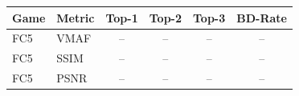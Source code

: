 \begin{tabular}{llcccc}
\toprule
Game & Metric & Top-1 & Top-2 & Top-3 & BD-Rate \\
\midrule
FC5 & VMAF & -- & -- & -- & -- \\
FC5 & SSIM & -- & -- & -- & -- \\
FC5 & PSNR & -- & -- & -- & -- \\
\bottomrule
\end{tabular}
